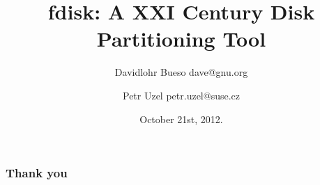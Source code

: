 \documentclass{beamer}
\begin{document}
\title{fdisk: A XXI Century Disk Partitioning Tool}
\author[]{Davidlohr Bueso dave@gnu.org \and Petr Uzel petr.uzel@suse.cz}
\date{October 21st, 2012.}

\begin{frame}
  \titlepage
\end{frame}









\begin{frame}\frametitle{Thank you}
\end{frame}
\end{document}
